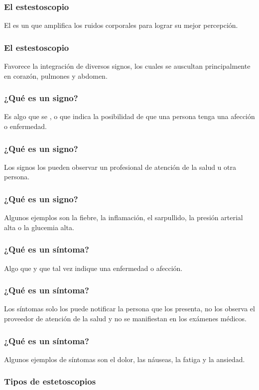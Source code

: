 \documentclass[14pt]{beamer}
\begin{document}
\begin{frame}
\frametitle{El estestoscopio}
El  es un  que amplifica los ruidos corporales para lograr su mejor percepción.
\end{frame}
\begin{frame}
\frametitle{El estestoscopio}
Favorece la integración de diversos signos, \pause los cuales se auscultan principalmente en corazón, pulmones y abdomen.
\end{frame}
\begin{frame}
\frametitle{¿Qué es un signo?}
Es algo que se , \pause {} \pause o  \pause que indica la posibilidad de que una persona tenga una afección o enfermedad.
\end{frame}
\begin{frame}
\frametitle{¿Qué es un signo?}
Los signos los pueden observar un profesional de atención de la salud u otra persona.
\end{frame}
\begin{frame}
\frametitle{¿Qué es un signo?}
Algunos ejemplos son la fiebre, la inflamación, el sarpullido, la presión arterial alta o la glucemia alta.
\end{frame}
\begin{frame}
\frametitle{¿Qué es un síntoma?}
Algo que  y que tal vez indique una enfermedad o afección.
\end{frame}
\begin{frame}
\frametitle{¿Qué es un síntoma?}
Los síntomas solo los puede notificar la persona que los presenta, \pause no los observa el proveedor de atención de la salud y no se manifiestan en los exámenes médicos.
\end{frame}
\begin{frame}
\frametitle{¿Qué es un síntoma?}
Algunos ejemplos de síntomas son el dolor, las náuseas, la fatiga y la ansiedad.
\end{frame}
\begin{frame}
\frametitle{Tipos de estetoscopios}
\schema
    {
    }
    {
        }
\end{frame}
\end{document}
